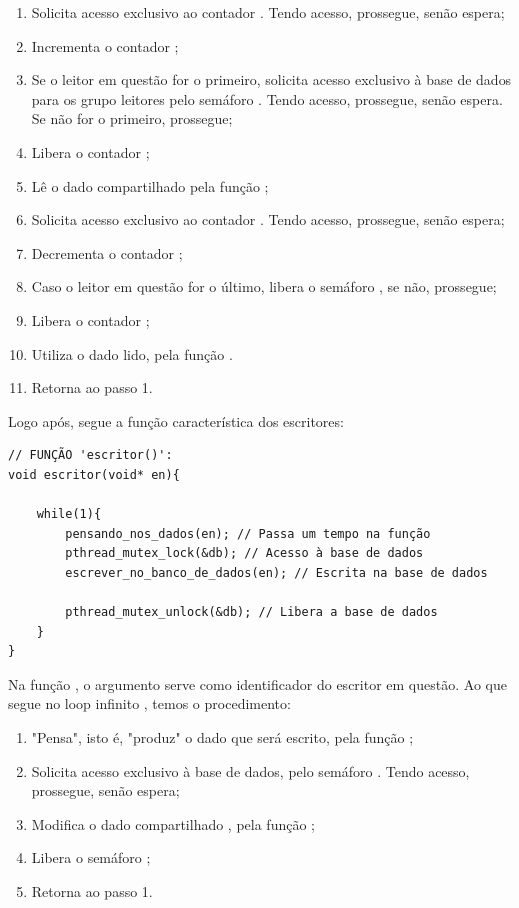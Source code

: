 \documentclass[
	12pt,				%
	openright,			%
	oneside,			%
	a4paper,			%
	chapter=TITLE,		%
	english,			%
	french,				%
	spanish,			%
	brazil				%
	]{abntex2}
\theoremstyle{definition}
\begin{document}
\begin{enumerate}
    \item Solicita acesso exclusivo ao contador . Tendo acesso, prossegue, senão espera;
    \item Incrementa o contador ;
    \item Se o leitor em questão for o primeiro, solicita acesso exclusivo à base de dados para os grupo leitores pelo semáforo . Tendo acesso, prossegue, senão espera. Se não for o primeiro, prossegue;
    \item Libera o contador ;
    \item Lê o dado compartilhado pela função ;
    \item Solicita acesso exclusivo ao contador . Tendo acesso, prossegue, senão espera;
    \item Decrementa o contador ;
    \item Caso o leitor em questão for o último, libera o semáforo , se não, prossegue;
    \item Libera o contador ;
    \item Utiliza o dado lido, pela função .
    \item Retorna ao passo 1.
\end{enumerate}

Logo após, segue a função característica dos escritores:

\begin{verbatim}
// FUNÇÃO 'escritor()':    
void escritor(void* en){
    
    while(1){
        pensando_nos_dados(en); // Passa um tempo na função
        pthread_mutex_lock(&db); // Acesso à base de dados
        escrever_no_banco_de_dados(en); // Escrita na base de dados

        pthread_mutex_unlock(&db); // Libera a base de dados
    }
}
\end{verbatim}

Na função , o argumento  serve como identificador do escritor em questão. Ao que segue no loop infinito , temos o procedimento:

\begin{enumerate}
    \item "Pensa", isto é, "produz" o dado que será escrito, pela função ;
    \item Solicita acesso exclusivo à base de dados, pelo semáforo . Tendo acesso, prossegue, senão espera;
    \item Modifica o dado compartilhado , pela função ;
    \item Libera o semáforo ;
    \item Retorna ao passo 1.
    
\end{enumerate}
\end{document}

